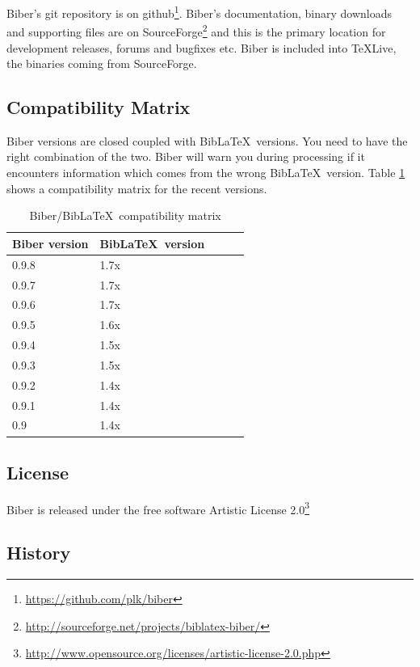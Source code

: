 \documentclass{ltxdockit}
\begin{document}
Biber's git repository is on
github\footnote{\url{https://github.com/plk/biber}}. Biber's documentation,
binary downloads and supporting files are on
SourceForge\footnote{\url{http://sourceforge.net/projects/biblatex-biber/}}
and this is the primary location for development releases, forums and
bugfixes etc. Biber is included into \TeX Live, the binaries coming from
SourceForge.

\subsection{Compatibility Matrix}

Biber versions are closed coupled with Bib\LaTeX\ versions. You
need to have the right combination of the two. Biber will warn you
during processing if it encounters information which comes from the wrong
Bib\LaTeX\ version. Table \ref{tab:compat} shows a compatibility
matrix for the recent versions.

\begin{table}
\begin{center}
\small
\begin{tabular}{lllll}
\toprule
Biber version & Bib\LaTeX\ version\\
\midrule
0.9.8 & 1.7x\\
0.9.7 & 1.7x\\
0.9.6 & 1.7x\\
0.9.5 & 1.6x\\
0.9.4 & 1.5x\\
0.9.3 & 1.5x\\
0.9.2 & 1.4x\\
0.9.1 & 1.4x\\
0.9 & 1.4x\\
\bottomrule
\end{tabular}
\end{center}
\caption{Biber/Bib\LaTeX\ compatibility matrix}
\label{tab:compat}
\end{table}

\subsection{License}

Biber is released under the free software Artistic License 2.0\footnote{\url{http://www.opensource.org/licenses/artistic-license-2.0.php}}

\subsection{History}
\end{document}
